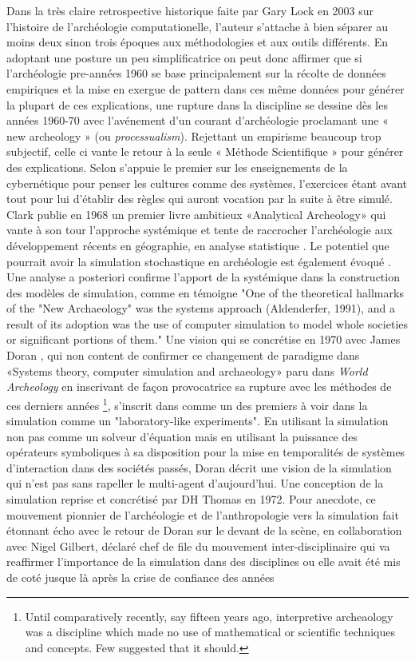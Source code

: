 
Dans la très claire retrospective historique faite par Gary Lock en 2003\cite{Lock2003} sur l'histoire de l'archéologie computationelle, l'auteur s'attache à bien séparer au moins deux sinon trois époques aux méthodologies et aux outils différents. En adoptant une posture un peu simplificatrice on peut donc affirmer que si l'archéologie pre-années 1960 se base principalement sur la récolte de données empiriques et la mise en exergue de pattern dans ces même données pour générer la plupart de ces explications, une rupture dans la discipline se dessine dès les années 1960-70 avec l'avénement d'un courant d'archéologie proclamant une « new archeology » (ou \emph{processualism}). Rejettant un empirisme beaucoup trop subjectif, celle ci vante le retour à la seule « Méthode Scientifique » pour générer des explications. Selon \autocite{Kohler2011} \autocite{Flanery1968} s'appuie le premier sur les enseignements de la cybernétique pour penser les cultures comme des systèmes, l'exercices étant avant tout pour lui d'établir des règles qui auront vocation par la suite à être simulé. Clark publie en 1968 un premier livre ambitieux «Analytical Archeology» qui vante à son tour l'approche systémique et tente de raccrocher l'archéologie aux développement récents en géographie, en analyse statistique \autocite{Kohler2011}. Le potentiel que pourrait avoir la simulation stochastique en archéologie est également évoqué \autocite{Clarke1968}. Une analyse a posteriori confirme l'apport de la systémique dans la construction des modèles de simulation, comme en témoigne \autocite{Aldenderfer1998} "One of the theoretical hallmarks of the "New Archaeology" was the systems approach (Aldenderfer, 1991), and a result of its adoption was the use of computer simulation to model whole societies or significant portions of them." Une vision qui se concrétise en 1970 avec James Doran \autocite{Doran1970} , qui non content de confirmer ce changement de paradigme dans  «Systems theory, computer simulation and archaeology» paru dans \emph{World Archeology} en inscrivant de façon provocatrice sa rupture avec les méthodes de ces derniers années \footnote{Until comparatively recently, say fifteen years ago, interpretive archeaology was a discipline which made no use of mathematical or scientific techniques and concepts. Few suggested that it should.}, s'inscrit dans comme un des premiers à voir dans la simulation comme un "laboratory-like experiments". En utilisant la simulation non pas comme un solveur d'équation mais en utilisant la puissance des opérateurs symboliques à sa disposition pour la mise en temporalités de systèmes d'interaction dans des sociétés passés, Doran décrit une vision de la simulation qui n'est pas sans rapeller le multi-agent d'aujourd'hui. Une conception de la simulation reprise et concrétisé par DH Thomas en 1972. Pour anecdote, ce mouvement pionnier de l'archéologie et de l'anthropologie vers la simulation fait étonnant écho avec le retour de Doran sur le devant de la scène, en collaboration avec Nigel Gilbert, déclaré chef de file du mouvement inter-disciplinaire qui va reaffirmer l'importance de la simulation dans des disciplines ou elle avait été mis de coté jusque là après la crise de confiance des années 